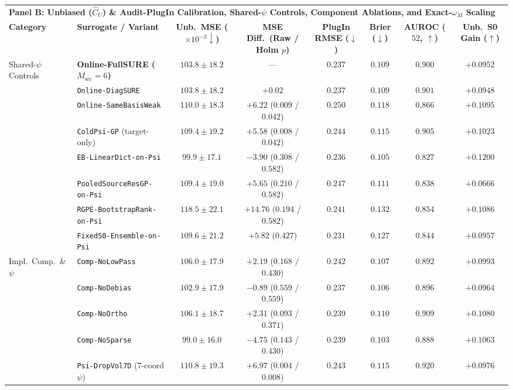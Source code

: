 \begin{table}[htbp]
{\begin{tabular}{llcccccc}
\midrule
\multicolumn{8}{l}{\textbf{Panel B: Unbiased ($\widehat{C}_U$) \& Audit-PlugIn Calibration, Shared-$\psi$ Controls, Component Ablations, and Exact-$\omega_M$ Scaling}} \\
\textbf{Category} & \textbf{Surrogate / Variant} & \textbf{Unb.\ MSE ($\times 10^{-3}\downarrow$)} & \textbf{MSE Diff.\ (Raw / Holm $p$)} & \textbf{PlugIn RMSE ($\downarrow$)} & \textbf{Brier ($\downarrow$)} & \textbf{AUROC ($52$, $\uparrow$)} & \textbf{Unb.\ S0 Gain ($\uparrow$)} \\
\midrule
Shared-$\psi$ Controls & \textbf{Online-FullSURE ($M_{\mathrm{src}}\!=\!6$)} & $103.8\pm18.2$ & --- & $0.237$ & $0.109$ & $0.900$ & $+0.0952$ \\
 & \texttt{Online-DiagSURE} & $103.8\pm18.2$ & $+0.02$ & $0.237$ & $0.109$ & $0.901$ & $+0.0948$ \\
 & \texttt{Online-SameBasisWeak} & $110.0\pm18.3$ & $+6.22$ ($0.009$ / $0.042$) & $0.250$ & $0.118$ & $0.866$ & $+0.1095$ \\
 & \texttt{ColdPsi-GP} (target-only) & $109.4\pm19.2$ & $+5.58$ ($0.008$ / $0.042$) & $0.244$ & $0.115$ & $0.905$ & $+0.1023$ \\
 & \texttt{EB-LinearDict-on-Psi} & $99.9\pm17.1$ & $-3.90$ ($0.308$ / $0.582$) & $0.236$ & $0.105$ & $0.827$ & $+0.1200$ \\
 & \texttt{PooledSourceResGP-on-Psi} & $109.4\pm19.0$ & $+5.65$ ($0.210$ / $0.582$) & $0.247$ & $0.111$ & $0.838$ & $+0.0666$ \\
 & \texttt{RGPE-BootstrapRank-on-Psi} & $118.5\pm22.1$ & $+14.76$ ($0.194$ / $0.582$) & $0.241$ & $0.132$ & $0.854$ & $+0.1086$ \\
 & \texttt{Fixed50-Ensemble-on-Psi} & $109.6\pm21.2$ & $+5.82$ ($0.427$) & $0.231$ & $0.127$ & $0.844$ & $+0.0957$ \\
Impl.\ Comp.\ \& $\psi$ & \texttt{Comp-NoLowPass} & $106.0\pm17.9$ & $+2.19$ ($0.168$ / $0.430$) & $0.242$ & $0.107$ & $0.892$ & $+0.0993$ \\
 & \texttt{Comp-NoDebias} & $102.9\pm17.9$ & $-0.89$ ($0.559$ / $0.559$) & $0.237$ & $0.106$ & $0.896$ & $+0.0964$ \\
 & \texttt{Comp-NoOrtho} & $106.1\pm18.7$ & $+2.31$ ($0.093$ / $0.371$) & $0.239$ & $0.110$ & $0.909$ & $+0.1080$ \\
 & \texttt{Comp-NoSparse} & $99.0\pm16.0$ & $-4.75$ ($0.143$ / $0.430$) & $0.239$ & $0.103$ & $0.888$ & $+0.1063$ \\
 & \texttt{Psi-DropVol7D} ($7$-coord $\psi$) & $110.8\pm19.3$ & $+6.97$ ($0.004$ / $0.008$) & $0.243$ & $0.115$ & $0.920$ & $+0.0976$ \\

\end{tabular}}
\end{table}
